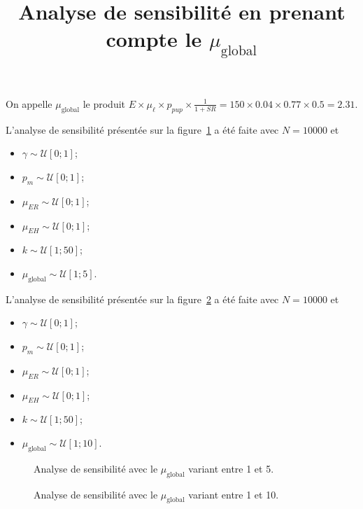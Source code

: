 \documentclass[a4paper, 11pt]{article}
\title{Analyse de sensibilité en prenant compte le $\mu_{\text{global}}$}
\author{}
\date{}
\begin{document}
\maketitle  

On appelle $\mu_{\text{global}}$ le produit $E \times \mu_\ell \times p_{pup} \times \frac{1}{1+SR} = 150 \times 0.04 \times 0.77 \times 0.5 = 2.31$.


L'analyse de sensibilité présentée sur la figure~\ref{fig:mug5} a été faite avec $N = 10000$ et 
\begin{itemize}
 \item $\gamma \sim \mathcal{U}[0;1]$;
 \item $p_m \sim \mathcal{U}[0;1]$;
 \item $\mu_{ER} \sim \mathcal{U}[0;1]$;
 \item $\mu_{EH} \sim \mathcal{U}[0;1]$;
 \item $k \sim \mathcal{U}[1;50]$;
 \item $\mu_{\text{global}} \sim \mathcal{U}[1;5]$.
\end{itemize}

L'analyse de sensibilité présentée sur la figure~\ref{fig:mug10} a été faite avec $N = 10000$ et 
\begin{itemize}
 \item $\gamma \sim \mathcal{U}[0;1]$;
 \item $p_m \sim \mathcal{U}[0;1]$;
 \item $\mu_{ER} \sim \mathcal{U}[0;1]$;
 \item $\mu_{EH} \sim \mathcal{U}[0;1]$;
 \item $k \sim \mathcal{U}[1;50]$;
 \item $\mu_{\text{global}} \sim \mathcal{U}[1;10]$.
\end{itemize}


\newpage


\begin{figure}[ht]
 \centering
 \caption{Analyse de sensibilité avec le $\mu_{\text{global}}$ variant entre 1 et 5.}
 \label{fig:mug5}
\end{figure}


\begin{figure}[!h]
 \centering
 \caption{Analyse de sensibilité avec le $\mu_{\text{global}}$ variant entre 1 et 10.}
 \label{fig:mug10}
\end{figure}
\end{document}

